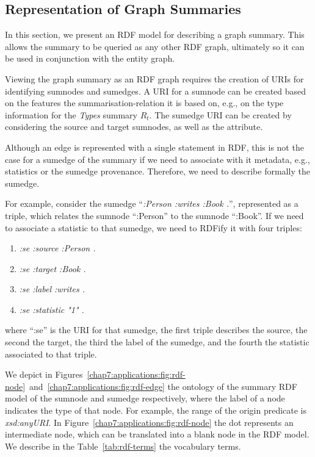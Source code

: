 \subsection{Representation of Graph Summaries}
\label{chap7:applications:wdm:summary-rdf}

In this section, we present an RDF model for describing a graph summary. This allows the summary to be queried as any other RDF graph, ultimately so it can be used in conjunction with the entity graph.

Viewing the graph summary as an RDF graph requires the creation of URIs for identifying sumnodes and sumedges. A URI for a sumnode can be created based on the features the \gls{summarisation-relation} it is based on, e.g., on the type information for the \emph{Types} summary $R_t$. The sumedge URI can be created by considering the source and target sumnodes, as well as the attribute.

\begin{remark}
	Although an edge is represented with a single statement in RDF, this is not the case for a sumedge of the summary if we need to associate with it metadata, e.g., statistics or the sumedge provenance. Therefore, we need to describe formally the sumedge.

	For example, consider the sumedge ``\emph{:Person :writes :Book .}'', represented as a triple, which relates the sumnode ``:Person'' to the sumnode ``:Book''. If we need to associate a statistic to that sumedge, we need to RDFify it with four triples:
	\begin{enumerate}
		\item \emph{:se :source :Person .}
		\item \emph{:se :target :Book .}
		\item \emph{:se :label :writes .}
		\item \emph{:se :statistic "1" .}
	\end{enumerate}
	where ``:se'' is the URI for that sumedge, the first triple describes the source, the second the target, the third the label of the sumedge, and the fourth the statistic associated to that triple.
\end{remark}

We depict in Figures~\ref{chap7:applications:fig:rdf-node}~and~\ref{chap7:applications:fig:rdf-edge} the ontology of the summary RDF model of the sumnode and sumedge respectively, where the label of a node indicates the type of that node. For example, the range of the origin predicate is \emph{xsd:anyURI}. In Figure~\ref{chap7:applications:fig:rdf-node} the dot represents an intermediate node, which can be translated into a blank node in the RDF model. We describe in the Table~\ref{tab:rdf-terms} the vocabulary terms.\\

